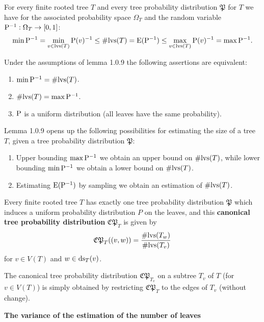\documentclass{report}
\def\E{{\rm E}}
\def\P{{\rm P}}
\begin{document}
\begin{enumerate}
			
			{\lem For every finite rooted tree $T$ and every tree probability distribution $\mathfrak{P}$ for $T$ we have for the associated probability space $\Omega_T$ and the random
				variable $\P^{-1} : \Omega_T \to [0,1]$:
				\[
				\min \P^{-1} = \min_{v\in {\rm lvs}(T)}\P(v)^{-1} \leq \#{\rm lvs}(T) = \E(\P^{-1} ) \leq \max_{v\in {\rm lvs}(T)}
				\P(v)^{-1} = \max \P^{-1} .
				\]}
			
			Under the assumptions of lemma 1.0.9 the following assertions are equivalent:
			
			\begin{enumerate} 
				\item $\min \P^{-1} = \#{\rm lvs}(T)$.
				
				\item $\#{\rm lvs}(T) = \max \P^{-1} $.
				
				\item $\P$ is a uniform distribution (all leaves have the same probability).
			\end{enumerate}
			
			Lemma 1.0.9 opens up the following possibilities for estimating the size of a
			tree $T$, given a tree probability distribution $\mathfrak{P}$:
			
			\begin{enumerate}
				\item Upper bounding $\max \P^{-1}$ we obtain an upper bound on $\#{\rm lvs}(T)$, while
				lower bounding $\min \P^{-1}$ we obtain a lower bound on $\#{\rm lvs}(T)$.
				
				\item Estimating $\E(\P^{-1} )$ by sampling we obtain an estimation of $\#{\rm lvs}(T)$.
			\end{enumerate}
			
			
			{\lem Every finite rooted tree $T$ has exactly one tree probability distribution $\mathfrak P$ which induces a uniform probability distribution ${P}$ on the leaves, and
				this {\bf canonical tree probability distribution} $\mathfrak{CP}_ T$ is given by
				\[
				\mathfrak{CP}_T ((v,w)) =\frac{\#{\rm lvs}(T_w )}{\#{\rm lvs}(T_v )}
				\]
				for $v \in V (T)$ and $w \in {\rm ds}_ T (v)$.}
			
			The canonical tree probability distribution $ \mathfrak{CP}_{T_v}$ on a subtree $T_v$ of $T $ (for
			$v \in V (T)$) is simply obtained by restricting $\mathfrak{CP}_T $ to the edges of $T_v$ (without
			change).
			
			{\bf The variance of the estimation of the number of leaves}
			

\end{enumerate}
\end{document}
